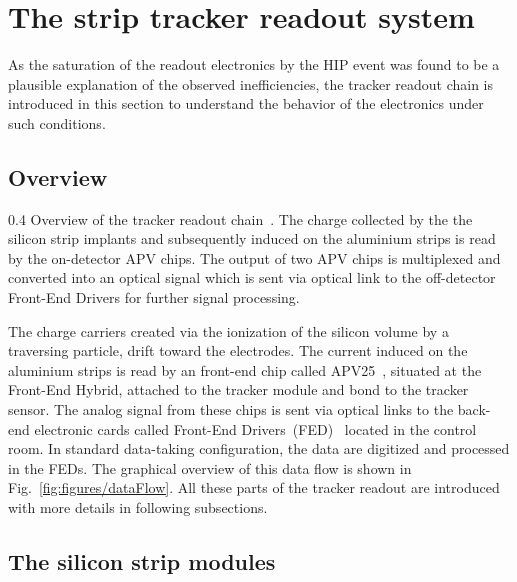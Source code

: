 \newpage

\section{The strip tracker readout system}

As the saturation of the readout electronics by the HIP event was found to be a plausible explanation of the observed inefficiencies, the tracker readout chain is introduced in this section to understand the behavior of the electronics under such conditions.


\subsection{Overview}

                 {0.4}       %
                 {Overview of the tracker readout chain~\cite{Bainbridge:2004jc}. The charge collected by the the silicon strip implants and subsequently induced on the aluminium strips is read by the on-detector APV chips. The output of two APV chips is multiplexed and converted into an optical signal which is sent via optical link to the off-detector Front-End Drivers for further signal processing. } %

The charge carriers created via the ionization of the silicon volume by a traversing particle, drift toward the electrodes. The current induced on the aluminium strips is read by an front-end chip called APV25~\cite{French:2001xb}, situated at the Front-End Hybrid, attached to the tracker module and bond to the tracker sensor. The analog signal from these chips is sent via optical links to the back-end electronic cards called Front-End Drivers~(FED)~\cite{Baird:2002wg} located in the control room. In standard data-taking configuration, the data are digitized and processed in the FEDs. The graphical overview of this data flow is shown in Fig.~\ref{fig:figures/dataFlow}. All these parts of the tracker readout are introduced with more details in following subsections.

\subsection{The silicon strip modules}

